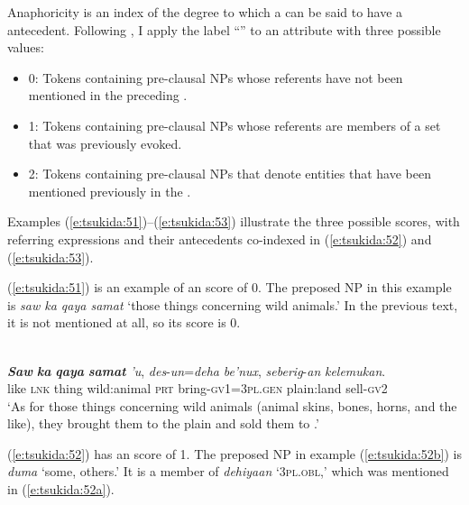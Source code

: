 \documentclass[output=paper
,modfonts
,nonflat]{langsci/langscibook}
\begin{document}
Anaphoricity is an index of the degree to which a  can be said to have a  antecedent. Following \citet[1687]{Gregory2001}, I apply the label “” to an attribute with three possible values:

\begin{itemize}
	\item 0: Tokens containing pre-clausal NPs whose referents have not been mentioned in the preceding .
	\item 1: Tokens containing pre-clausal NPs whose referents are members of a set that was previously evoked.
	\item 2: Tokens containing pre-clausal NPs that denote entities that have been mentioned previously in the .
\end{itemize}

\noindent
Examples (\ref{e:tsukida:51})–(\ref{e:tsukida:53}) illustrate the three possible  scores, with referring expressions and their antecedents co-indexed in (\ref{e:tsukida:52}) and (\ref{e:tsukida:53}). 

(\ref{e:tsukida:51}) is an example of an  score of 0. The preposed NP in this example is \textit{saw ka qaya samat} ‘those things concerning wild animals.’ In the previous text, it is not mentioned at all, so its  score is 0.

\begin{exe}
	\label{e:tsukida:51}\\
	\gll \textbf{\textit{Saw}} \textbf{\textit{ka}} \textbf{\textit{qaya}} \textbf{\textit{samat}} \textit{'u},  \textit{des}-\textit{un}=\textit{deha} \textit{be'nux},   \textit{seberig}-\textit{an}   \textit{kelemukan}.\\
	like \textsc{lnk} thing wild:animal \textsc{prt} bring-\textsc{gv1}=\textsc{3pl}.\textsc{gen} plain:land  sell-\textsc{gv2} \\
	\glt ‘As for those things concerning wild animals (animal skins, bones, horns, and the like), they brought them to the plain and sold them to .’
\end{exe}

\noindent
(\ref{e:tsukida:52}) has an  score of 1. The preposed NP in example (\ref{e:tsukida:52b}) is \textit{duma} ‘some, others.’ It is a member of \textit{dehiyaan} ‘\textsc{3pl}.\textsc{obl},’ which was mentioned in (\ref{e:tsukida:52a}). 
\end{document}
